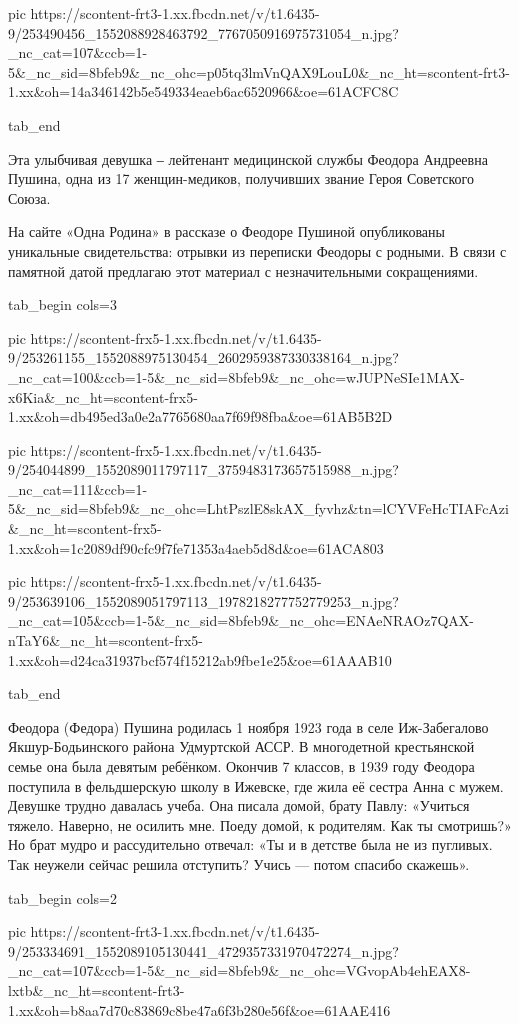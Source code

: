      pic https://scontent-frt3-1.xx.fbcdn.net/v/t1.6435-9/253490456_1552088928463792_7767050916975731054_n.jpg?_nc_cat=107&ccb=1-5&_nc_sid=8bfeb9&_nc_ohc=p05tq3lmVnQAX9LouL0&_nc_ht=scontent-frt3-1.xx&oh=14a346142b5e549334eaeb6ac6520966&oe=61ACFC8C

  tab_end
\fi

Эта улыбчивая девушка ‒ лейтенант медицинской службы Феодора Андреевна Пушина,
одна из 17 женщин-медиков, получивших звание Героя Советского Союза.

На сайте «Одна Родина» в рассказе о Феодоре Пушиной опубликованы уникальные
свидетельства: отрывки из переписки Феодоры с родными. В связи с памятной датой
предлагаю этот материал с незначительными сокращениями.

\ifcmt
  tab_begin cols=3

     pic https://scontent-frx5-1.xx.fbcdn.net/v/t1.6435-9/253261155_1552088975130454_2602959387330338164_n.jpg?_nc_cat=100&ccb=1-5&_nc_sid=8bfeb9&_nc_ohc=wJUPNeSIe1MAX-x6Kia&_nc_ht=scontent-frx5-1.xx&oh=db495ed3a0e2a7765680aa7f69f98fba&oe=61AB5B2D

     pic https://scontent-frx5-1.xx.fbcdn.net/v/t1.6435-9/254044899_1552089011797117_3759483173657515988_n.jpg?_nc_cat=111&ccb=1-5&_nc_sid=8bfeb9&_nc_ohc=LhtPszlE8skAX_fyvhz&tn=lCYVFeHcTIAFcAzi&_nc_ht=scontent-frx5-1.xx&oh=1c2089df90cfc9f7fe71353a4aeb5d8d&oe=61ACA803

     pic https://scontent-frx5-1.xx.fbcdn.net/v/t1.6435-9/253639106_1552089051797113_1978218277752779253_n.jpg?_nc_cat=105&ccb=1-5&_nc_sid=8bfeb9&_nc_ohc=ENAeNRAOz7QAX-nTaY6&_nc_ht=scontent-frx5-1.xx&oh=d24ca31937bcf574f15212ab9fbe1e25&oe=61AAAB10

  tab_end
\fi

Феодора (Федора) Пушина родилась 1 ноября 1923 года в селе Иж-Забегалово
Якшур-Бодьинского района Удмуртской АССР. В многодетной крестьянской семье она
была девятым ребёнком. Окончив 7 классов, в 1939 году Феодора поступила в
фельдшерскую школу в Ижевске, где жила её сестра Анна с мужем. Девушке трудно
давалась учеба. Она писала домой, брату Павлу: «Учиться тяжело. Наверно, не
осилить мне. Поеду домой, к родителям. Как ты смотришь?» Но брат мудро и
рассудительно отвечал: «Ты и в детстве была не из пугливых. Так неужели сейчас
решила отступить? Учись — потом спасибо скажешь».

\ifcmt
  tab_begin cols=2

     pic https://scontent-frt3-1.xx.fbcdn.net/v/t1.6435-9/253334691_1552089105130441_4729357331970472274_n.jpg?_nc_cat=107&ccb=1-5&_nc_sid=8bfeb9&_nc_ohc=VGvopAb4ehEAX8-lxtb&_nc_ht=scontent-frt3-1.xx&oh=b8aa7d70c83869c8be47a6f3b280e56f&oe=61AAE416

